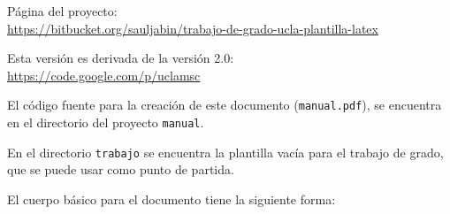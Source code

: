 \introduccion


\noindent
Página del proyecto: \\ {\footnotesize \url{https://bitbucket.org/sauljabin/trabajo-de-grado-ucla-plantilla-latex}}

\noindent
Esta versión es derivada de la versión 2.0: \\ {\footnotesize \url{https://code.google.com/p/uclamsc}}

El código fuente para la creación de este documento (\texttt{manual.pdf}), se encuentra en el directorio del proyecto \texttt{manual}.

En el directorio \texttt{trabajo} se encuentra la plantilla vacía para el trabajo de grado, que se puede usar como punto de partida.

El cuerpo básico para el documento tiene la siguiente forma:


